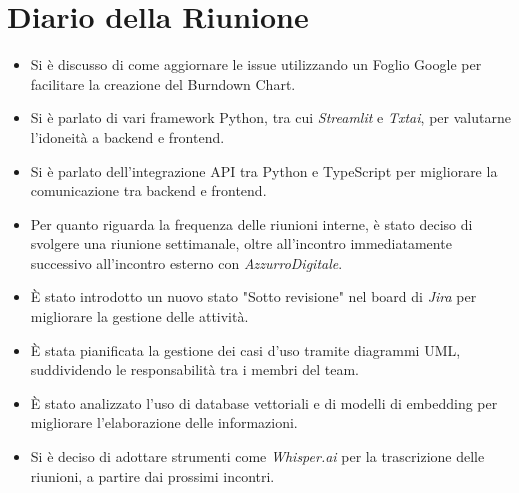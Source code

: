 
\section{Diario della Riunione}

\begin{itemize}
    \item Si è discusso di come aggiornare le issue utilizzando un Foglio Google per facilitare la creazione del Burndown Chart.
    \item Si è parlato di vari framework Python, tra cui \emph{Streamlit} e \emph{Txtai}, per valutarne l’idoneità a backend e frontend.
    \item Si è parlato dell'integrazione API tra Python e TypeScript per migliorare la comunicazione tra backend e frontend.
    \item Per quanto riguarda la frequenza delle riunioni interne, è stato deciso di svolgere una riunione settimanale, oltre all'incontro 
    immediatamente successivo all'incontro esterno con \emph{AzzurroDigitale}.
    \item È stato introdotto un nuovo stato "Sotto revisione" nel board di \emph{Jira} per migliorare la gestione delle attività.
    \item È stata pianificata la gestione dei casi d’uso tramite diagrammi UML, suddividendo le responsabilità tra i membri del team.
    \item È stato analizzato l'uso di database vettoriali e di modelli di embedding per migliorare l’elaborazione delle informazioni.
    \item Si è deciso di adottare strumenti come \emph{Whisper.ai} per la trascrizione delle riunioni, a partire dai prossimi incontri.
\end{itemize}

